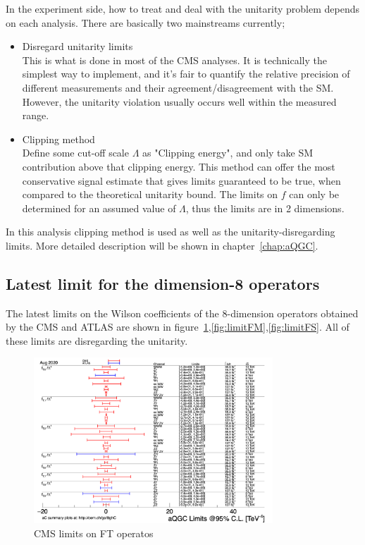 In the experiment side, how to treat and deal with the unitarity problem depends on each analysis. 
There are basically two mainstreams currently;
\begin{itemize}
    \item Disregard unitarity limits \\
    This is what is done in most of the CMS analyses. It is technically the simplest way to implement, and it's fair to quantify the relative precision of different measurements and their agreement/disagreement with the SM. However, the unitarity violation usually occurs well within the measured range.
    \item Clipping method \\
    Define some cut-off scale $\Lambda$ as "Clipping energy", and only take SM contribution above that clipping energy. This method can offer the most conservative signal estimate that gives limits guaranteed to be true, when compared to the theoretical unitarity bound. The limits on $f$ can only be determined for an assumed value of $\Lambda$, thus the limits are in 2 dimensions.
\end{itemize}
In this analysis clipping method is used as well as the unitarity-disregarding limits. 
More detailed description will be shown in chapter~\ref{chap:aQGC}.

\subsection{Latest limit for the dimension-8 operators}
The latest limits on the Wilson coefficients of the 8-dimension operators obtained by the CMS and ATLAS are shown in figure~\ref{fig:limitFT},\ref{fig:limitFM},\ref{fig:limitFS}. All of these limits are disregarding the unitarity.
\begin{figure}[tbp]
\begin{center}
 \includegraphics[width=0.80\textwidth,keepaspectratio]{figures/aQGC/aQGC_ft.png}
\caption{CMS limits on FT operatos}
\label{fig:limitFT}
\end{center}
\end{figure}

